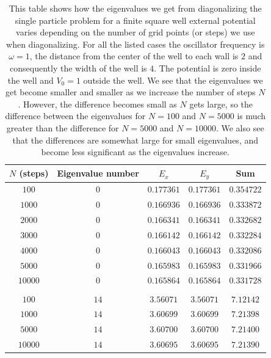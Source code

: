 \documentclass[../main.tex]{subfiles}
\begin{document}
\begin{table}[!ht]
  \centering
  \begin{tabular}{ | c | c | c | c | c | }
    \hline
    $N$ (steps) & Eigenvalue number & $E_x$ & $E_y$ & Sum\\*
    \hline
    $100$ & $0$ & $0.177361$ & $0.177361$ & $0.354722$ \\*
    \hline
    $1000$ & $0$ & $0.166936$ & $0.166936$ & $0.333872$ \\*
    \hline
    $2000$ & $0$ & $0.166341$ & $0.166341$ & $0.332682$ \\*
    \hline
    $3000$ & $0$ & $0.166142$ & $0.166142$ & $0.332284$ \\*
    \hline
    $4000$ & $0$ & $0.166043$ & $0.166043$ & $0.332086$ \\*
    \hline
    $5000$ & $0$ & $0.165983$ & $0.165983$ & $0.331966$ \\*
    \hline
    $10000$ & $0$ & $0.165864$ & $0.165864$ & $0.331728$ \\*
    \hline
     & & & &\\*
    \hline
    $100$ & $14$ & $3.56071$ & $3.56071$ & $7.12142$ \\*
    \hline
    $1000$ & $14$ & $3.60699$ & $3.60699$ & $7.21398$ \\*
    \hline
    $5000$ & $14$ & $3.60700$ & $3.60700$ & $7.21400$ \\*
    \hline
    $10000$ & $14$ & $3.60695$ & $3.60695$ & $7.21390$ \\*
    \hline
  \end{tabular}
  \caption{This table shows how the eigenvalues we get from diagonalizing the single particle problem for a finite square well external potential varies depending on the number of grid points (or steps) we use when diagonalizing. For all the listed cases the oscillator frequency is $\omega = 1$, the distance from the center of the well to each wall is $2$ and consequently the width of the well is $4$. The potential is zero inside the well and $V_0 = 1$ outside the well. We see that the eigenvalues we get become smaller and smaller as we increase the number of steps $N$. However, the difference becomes small as $N$ gets large, so the difference between the eigenvalues for $N=100$ and $N=5000$ is much greater than the difference for $N=5000$ and $N=10000$. We also see that the differences are somewhat large for small eigenvalues, and become less significant as the eigenvalues increase.}
  \label{tab:SquareWellEigVals}
\end{table}
\end{document}
